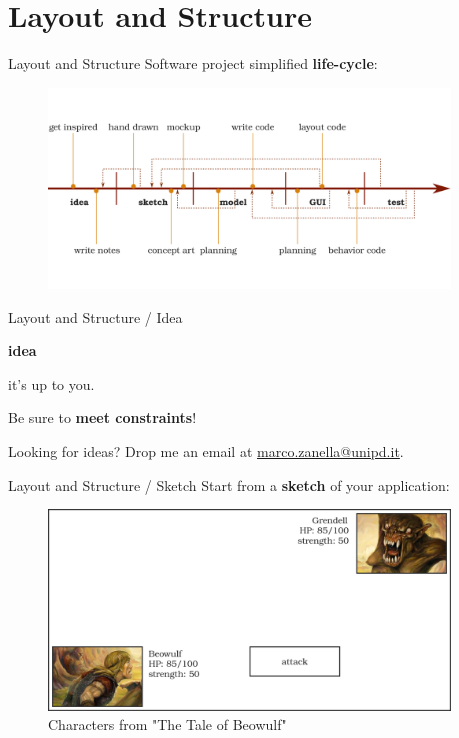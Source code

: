 \documentclass[11pt]{beamer}
\renewcommand{\emph}[1]{\textbf{#1}}
\begin{document}
\section{Layout and Structure}
\begin{frame}{Layout and Structure}
 Software project simplified \emph{life-cycle}:
 \begin{figure}
  \includegraphics[width=0.95\textwidth]{assets/figure-project-plan}
 \end{figure}
\end{frame}

\begin{frame}{Layout and Structure / Idea}
 \begin{center}
  \emph{idea}
  
  it's up to you.
 \end{center}
 \vspace{2cm}
 Be sure to \emph{meet constraints}!
 
 Looking for ideas? Drop me an email at \href{mailto:marco.zanella@unipd.it}{marco.zanella@unipd.it}.
\end{frame}

\begin{frame}{Layout and Structure / Sketch}
 Start from a \emph{sketch} of your application:
 \begin{figure}
  \includegraphics[width=0.95\textwidth]{assets/figure-battle-scene-1}
  \caption{Characters from "The Tale of Beowulf"}
 \end{figure}
\end{frame}
\end{document}
